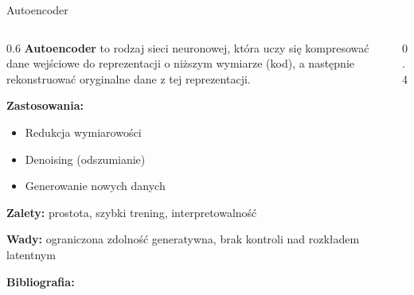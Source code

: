 \documentclass{beamer}
\begin{document}
\begin{frame}{Autoencoder}
    \begin{columns}
        \begin{column}{0.6\textwidth}
            \textbf{Autoencoder} to rodzaj sieci neuronowej, która uczy się kompresować dane wejściowe do reprezentacji o niższym wymiarze (kod), a następnie rekonstruować oryginalne dane z tej reprezentacji.

            \medskip
            \textbf{Zastosowania:}
            \begin{itemize}
                \item Redukcja wymiarowości
                \item Denoising (odszumianie)
                \item Generowanie nowych danych
            \end{itemize}

            \textbf{Zalety:} prostota, szybki trening, interpretowalność

            \textbf{Wady:} ograniczona zdolność generatywna, brak kontroli nad rozkładem latentnym

            \textbf{Bibliografia:} \cite{hinton2006reducing}
        \end{column}
        \begin{column}{0.4\textwidth}
            \centering
        \end{column}
    \end{columns}
\end{frame}
\end{document}

